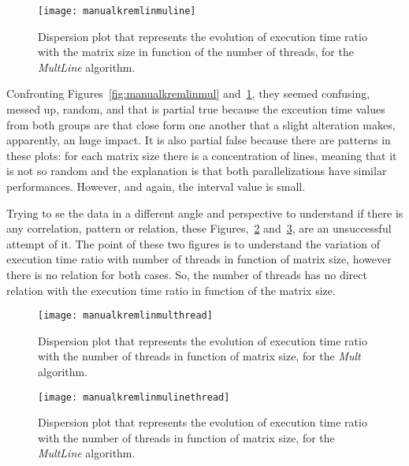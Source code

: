 \begin{figure}[htb]
	\begin{center}
		\leavevmode
		\texttt{[image: manualkremlinmuline]}
		\caption{Dispersion plot that represents the evolution of execution time ratio with the matrix size in function of the number of threads, for the \textit{MultLine} algorithm.}
		\label{fig:manualkremlinmuline}
	\end{center}
\end{figure}

Confronting Figures~\ref{fig:manualkremlinmul} and~\ref{fig:manualkremlinmuline}, they seemed confusing, messed up, random, and that is partial true because the exceution time values from both groups are that close form one another that a slight alteration makes, apparently, an huge impact. It is also partial false because there are patterns in these plots: for each matrix size there is a concentration of lines, meaning that it is not so random and the explanation is that both parallelizations have similar performances. However, and again, the interval value is small.

Trying to se the data in a different angle and perspective to understand if there is any correlation, pattern or relation, these Figures,~\ref{fig:manualkremlinmulthread} and~\ref{fig:manualkremlinmulinethread}, are an unsuccessful attempt of it. The point of these two figures is to understand the variation of execution time ratio with number of threads in function of matrix size, however there is no relation for both cases. So, the number of threads has no direct relation with the execution time ratio in function of the matrix size.


\begin{figure}[htb]
	\begin{center}
		\leavevmode
		\texttt{[image: manualkremlinmulthread]}
		\caption{Dispersion plot that represents the evolution of execution time ratio with the number of threads in function of matrix size, for the \textit{Mult} algorithm.}
		\label{fig:manualkremlinmulthread}
	\end{center}
\end{figure}

\begin{figure}[htb]
	\begin{center}
		\leavevmode
		\texttt{[image: manualkremlinmulinethread]}
		\caption{Dispersion plot that represents the evolution of execution time ratio with the number of threads in function of matrix size, for the \textit{MultLine} algorithm.}
		\label{fig:manualkremlinmulinethread}
	\end{center}
\end{figure}

